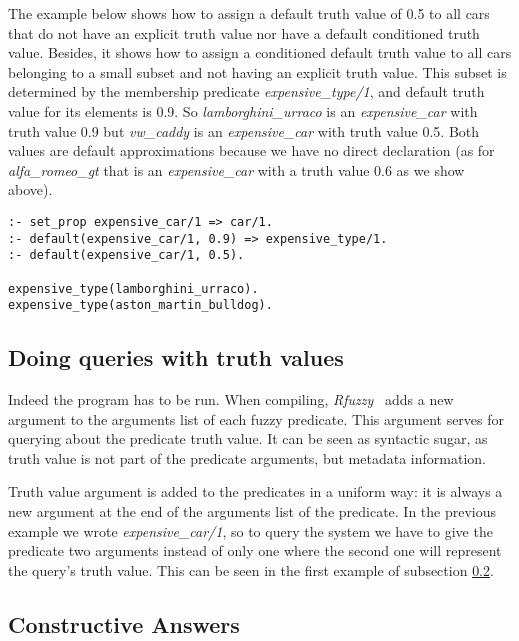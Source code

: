 \documentclass[runningheads,a4paper]{llncs}
\begin{document}
The example below shows how to assign a default truth value of 0.5 
to all cars that do not have an explicit truth value nor have
a default conditioned truth value. 
Besides, it shows how to assign a conditioned default truth value 
to all cars belonging to a small subset and not having an explicit
truth value. 
This subset is determined by the membership predicate 
{\it expensive\_type/1}, 
and default truth value for its elements is 0.9.
So {\it lamborghini\_urraco} is an {\it
expensive\_car} with truth value 0.9 but {\it vw\_caddy} is an {\it
expensive\_car} with truth value 0.5. Both values are default
approximations because we have no direct declaration (as for {\it
alfa\_romeo\_gt} that is an {\it expensive\_car} with a truth value
0.6 as we show above).

\begin{verbatim}
:- set_prop expensive_car/1 => car/1.
:- default(expensive_car/1, 0.9) => expensive_type/1.
:- default(expensive_car/1, 0.5).

expensive_type(lamborghini_urraco).
expensive_type(aston_martin_bulldog).
\end{verbatim}

\subsection{Doing queries with truth values}
\label{doing-queries-with-truth-values}

Indeed the program has to be run. 
When compiling, {\it Rfuzzy\ } adds a new argument to the 
arguments list of each fuzzy predicate.
This argument serves for querying about the predicate truth value.
It can be seen as syntactic sugar, 
as truth value is not part of the predicate arguments, 
but metadata information. 

Truth value argument is added to the predicates in a uniform way:
it is always a new argument at the end of the arguments list of the predicate.
In the previous example we wrote {\it expensive\_car/1}, so to query 
the system we have to give the predicate two arguments instead of only one
where the second one will represent the query's truth value.
This can be seen in the first example of subsection \ref{constructive-answers}.

\subsection{Constructive Answers}
\label{constructive-answers}
\end{document}
